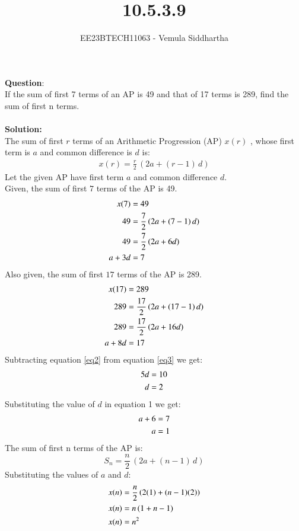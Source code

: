 \documentclass[journal,12pt,twocolumn]{IEEEtran}
\theoremstyle{remark}
\begin{document}

\vspace{3cm}

\title{10.5.3.9}
\author{EE23BTECH11063 - Vemula Siddhartha
}
\maketitle
\newpage
\bigskip

\renewcommand{\thefigure}{\theenumi}
\renewcommand{\thetable}{\theenumi}
\textbf{Question}:\\
If the sum of first 7 terms of an AP is 49 and that of 17 terms is 289, find the sum of
first n terms.
\\\\
\textbf{Solution: }\\
The sum of first $r$ terms of an Arithmetic Progression (AP) $x(r)$ , whose first term is $a$ and common difference is $d$ is:
\begin{align}
x(r)=\frac{r}{2}\,(2a+(r-1)\,d)\label{eq1}
\end{align}
Let the given AP have first term $a$ and common difference $d$.\\
Given, the sum of first $7$ terms of the AP is 49.
\begin{align}
x(7)&=49\notag\\
49&=\frac{7}{2}\,(2a+(7-1)\,d)\notag\\
49&=\frac{7}{2}\,(2a+6d)\notag\\
a+3d&=7\label{eq2}
\end{align}
Also given, the sum of first $17$ terms of the AP is 289.
\begin{align}
x(17)&=289\notag\\
289&=\frac{17}{2}\,(2a+(17-1)\,d)\notag\\
289&=\frac{17}{2}\,(2a+16d)\notag\\
a+8d&=17\label{eq3}
\end{align}
Subtracting equation \ref{eq2} from equation \ref{eq3} we get:
\begin{align}
5d&=10\notag\\
d&=2\label{eq4}
\end{align}
Substituting the value of $d$ in equation 1 we get:
\begin{align}
a+6&=7\notag\\
a&=1\label{eq5}
\end{align}
The sum of first n terms of the AP is:
\[S_n= \frac{n}{2}\,(2a+(n-1)\,d)\]
Substituting the values of $a$ and $d$:
\begin{align}
x(n)&=\frac{n}{2}\,(2(1)+(n-1)(2))\notag\\
x(n)&=n\,(1+n-1)\notag\\
x(n)&=n^2\label{eq6}
\end{align}
\end{document}
